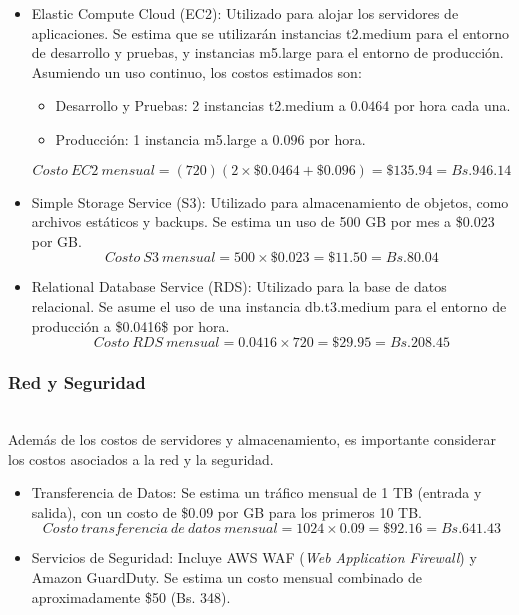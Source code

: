 \begin{itemize}[noitemsep,topsep=0pt,parsep=0pt,partopsep=0pt]
    \item Elastic Compute Cloud (EC2): Utilizado para alojar los servidores de aplicaciones. Se estima que se utilizarán instancias t2.medium para el entorno de desarrollo y pruebas, y instancias m5.large para el entorno de producción. Asumiendo un uso continuo, los costos estimados son:
    \begin{itemize}[noitemsep,topsep=0pt,parsep=0pt,partopsep=0pt]
    \item Desarrollo y Pruebas: 2 instancias t2.medium a $0.0464$ por hora cada una.
    \item Producción: 1 instancia m5.large a $0.096$ por hora.
    \end{itemize}
    \begin{equation*}\label{eq_costo_ec2}
    Costo\ EC2\ mensual = (720) ( 2 \times \$0.0464 + \$0.096) = \$135.94 = Bs.946.14
    \end{equation*}
    \item Simple Storage Service (S3): Utilizado para almacenamiento de objetos, como archivos estáticos y backups. Se estima un uso de 500 GB por mes a \$0.023 por GB.
    \begin{equation*}\label{eq_costo_s3}
    Costo\ S3\ mensual = 500 \times \$0.023 = \$11.50 = Bs.80.04
    \end{equation*}
    \item Relational Database Service (RDS): Utilizado para la base de datos relacional. Se asume el uso de una instancia db.t3.medium para el entorno de producción a \$0.0416\$ por hora.
    \begin{equation*}\label{eq_costo_rds}
    Costo\ RDS\ mensual = 0.0416 \times 720 = \$29.95 = Bs.208.45
    \end{equation*}
\end{itemize}

\subsubsection{Red y Seguridad}\hfill\\ 
\indent
Además de los costos de servidores y almacenamiento, es importante considerar los costos asociados a la red y la seguridad.

\begin{itemize}[noitemsep,topsep=0pt,parsep=0pt,partopsep=0pt]
\item Transferencia de Datos: Se estima un tráfico mensual de 1 TB (entrada y salida), con un costo de \$0.09 por GB para los primeros 10 TB.
\begin{equation*}\label{eq_transf_datos}
Costo\ transferencia\ de\ datos\ mensual = 1024 \times 0.09 = \$92.16 = Bs.641.43
\end{equation*}
\item Servicios de Seguridad: Incluye AWS WAF (\textit{Web Application Firewall}) y Amazon GuardDuty. Se estima un costo mensual combinado de aproximadamente \$50 (Bs. 348).
\end{itemize}

